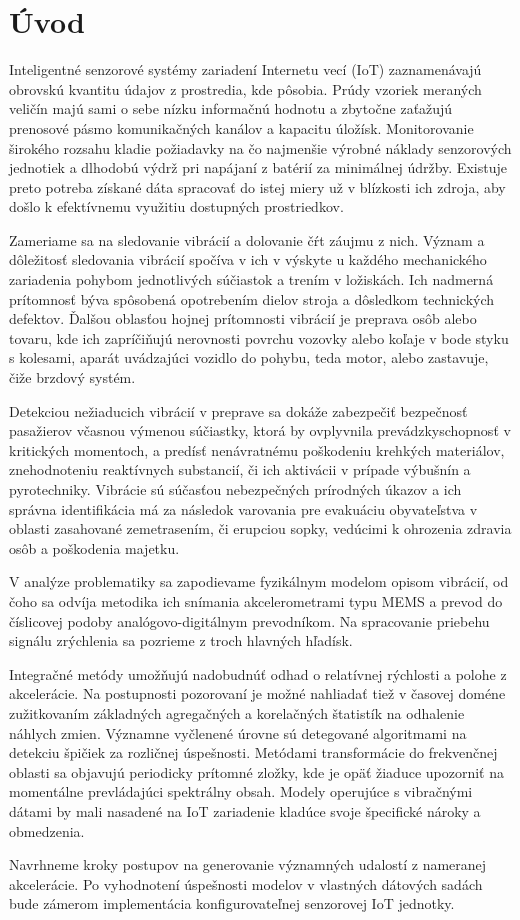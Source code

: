\chapter{Úvod}
Inteligentné senzorové systémy zariadení Internetu vecí (IoT) zaznamenávajú obrovskú kvantitu údajov z prostredia, kde
pôsobia. Prúdy vzoriek meraných veličín majú sami o sebe nízku informačnú hodnotu a zbytočne zaťažujú
prenosové pásmo komunikačných kanálov a kapacitu úložísk. Monitorovanie širokého rozsahu kladie požiadavky
na čo najmenšie výrobné náklady senzorových jednotiek a dlhodobú výdrž pri napájaní z batérií za minimálnej údržby.
Existuje preto potreba získané dáta spracovať do istej miery už v blízkosti ich zdroja, aby došlo k efektívnemu
využitiu dostupných prostriedkov.

Zameriame sa na sledovanie vibrácií a dolovanie čŕt záujmu z nich. Význam a dôležitosť sledovania vibrácií spočíva v ich v
výskyte u každého mechanického zariadenia pohybom jednotlivých súčiastok a trením v ložiskách. Ich nadmerná prítomnosť
býva spôsobená opotrebením dielov stroja a dôsledkom technických defektov. Ďalšou oblasťou hojnej prítomnosti vibrácií
je preprava osôb alebo tovaru, kde ich zapríčiňujú nerovnosti povrchu vozovky alebo koľaje v bode styku s kolesami, aparát
uvádzajúci vozidlo do pohybu, teda motor, alebo zastavuje, čiže brzdový systém.

Detekciou nežiaducich vibrácií v preprave sa dokáže zabezpečiť bezpečnosť pasažierov včasnou výmenou súčiastky,
ktorá by ovplyvnila prevádzkyschopnosť v kritických momentoch, a predísť nenávratnému poškodeniu krehkých materiálov,
znehodnoteniu reaktívnych substancií, či ich aktivácii v prípade výbušnín a pyrotechniky. Vibrácie
sú súčasťou nebezpečných prírodných úkazov a ich správna identifikácia má za následok varovania
pre evakuáciu obyvateľstva v oblasti zasahované zemetrasením, či erupciou sopky, vedúcimi
k ohrozenia zdravia osôb a poškodenia majetku.

V analýze problematiky sa zapodievame fyzikálnym modelom opisom vibrácií, od čoho sa odvíja metodika ich snímania
akcelerometrami typu MEMS a prevod do číslicovej podoby analógovo-digitálnym prevodníkom. Na spracovanie priebehu
signálu zrýchlenia sa pozrieme z troch hlavných hľadísk.

Integračné metódy umožňujú nadobudnúť odhad o relatívnej rýchlosti a polohe z akcelerácie. Na postupnosti pozorovaní
je možné nahliadať tiež v časovej doméne zužitkovaním základných agregačných a korelačných štatistík na odhalenie
náhlych zmien. Významne vyčlenené úrovne sú detegované
algoritmami na detekciu špičiek za rozličnej úspešnosti. Metódami transformácie do frekvenčnej oblasti sa
objavujú periodicky prítomné zložky, kde je opäť žiaduce upozorniť na momentálne prevládajúci spektrálny obsah.
Modely operujúce s vibračnými dátami by mali nasadené na IoT zariadenie kladúce svoje špecifické nároky a
obmedzenia.

Navrhneme kroky postupov na generovanie významných udalostí z nameranej akcelerácie. Po vyhodnotení úspešnosti
modelov v vlastných dátových sadách bude zámerom implementácia konfigurovateľnej senzorovej IoT jednotky.

